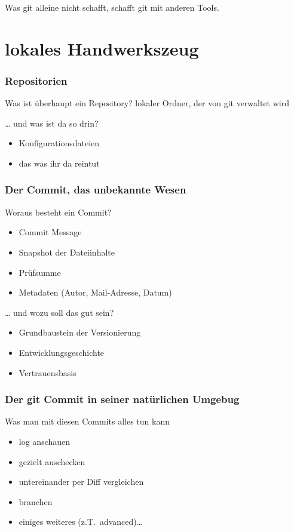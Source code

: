 \documentclass{beamer}
\begin{document}
\begin{frame}
Was git alleine nicht schafft, schafft git mit anderen Tools.
\end{frame}

\section{lokales Handwerkszeug}

\begin{frame}
	\frametitle{Repositorien}
	\begin{block}{Was ist überhaupt ein Repository?}
		\pause
		lokaler Ordner, der von git verwaltet wird
	\end{block}
	\pause
	\begin{block}{… und was ist da so drin?}
		\begin{itemize}
			\item Konfigurationsdateien
				\pause
			\item das was ihr da reintut
		\end{itemize}
	\end{block}
\end{frame}

\begin{frame}
	\frametitle{Der Commit, das unbekannte Wesen}
	\begin{block}{Woraus besteht ein Commit?}
		\begin{itemize}
			\item Commit Message
				\pause
			\item Snapshot der Dateiinhalte
				\pause
			\item Prüfsumme
				\pause
			\item Metadaten (Autor, Mail-Adresse, Datum)
		\end{itemize}
	\end{block}
	\pause
	\begin{block}{… und wozu soll das gut sein?}
		\begin{itemize}
			\item Grundbaustein der Versionierung
				\pause
			\item Entwicklungsgeschichte
				\pause
			\item Vertrauensbasis
		\end{itemize}
	\end{block}
\end{frame}

\begin{frame}
	\frametitle{Der git Commit in seiner natürlichen Umgebug}
	\begin{block}{Was man mit diesen Commits alles tun kann}
		\begin{itemize}
			\item log anschauen
				\pause
			\item gezielt auschecken
				\pause
			\item untereinander per Diff vergleichen
				\pause
			\item branchen
				\pause
			\item einiges weiteres (z.T.\ advanced)…
		\end{itemize}
	\end{block}
\end{frame}
\end{document}
